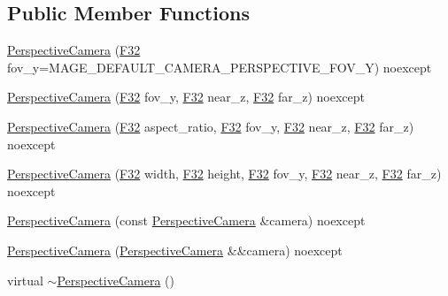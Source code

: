 \subsection*{Public Member Functions}
\begin{DoxyCompactItemize}
\item 
\hyperlink{classmage_1_1_perspective_camera_a64b7794febfaaf250117279095c709a2}{Perspective\+Camera} (\hyperlink{namespacemage_aa97e833b45f06d60a0a9c4fc22ae02c0}{F32} fov\+\_\+y=M\+A\+G\+E\+\_\+\+D\+E\+F\+A\+U\+L\+T\+\_\+\+C\+A\+M\+E\+R\+A\+\_\+\+P\+E\+R\+S\+P\+E\+C\+T\+I\+V\+E\+\_\+\+F\+O\+V\+\_\+Y) noexcept
\item 
\hyperlink{classmage_1_1_perspective_camera_a2be0521c2d0da56c10442928be5fc1c3}{Perspective\+Camera} (\hyperlink{namespacemage_aa97e833b45f06d60a0a9c4fc22ae02c0}{F32} fov\+\_\+y, \hyperlink{namespacemage_aa97e833b45f06d60a0a9c4fc22ae02c0}{F32} near\+\_\+z, \hyperlink{namespacemage_aa97e833b45f06d60a0a9c4fc22ae02c0}{F32} far\+\_\+z) noexcept
\item 
\hyperlink{classmage_1_1_perspective_camera_a9e59b05f13dba33c00b251ae952943d6}{Perspective\+Camera} (\hyperlink{namespacemage_aa97e833b45f06d60a0a9c4fc22ae02c0}{F32} aspect\+\_\+ratio, \hyperlink{namespacemage_aa97e833b45f06d60a0a9c4fc22ae02c0}{F32} fov\+\_\+y, \hyperlink{namespacemage_aa97e833b45f06d60a0a9c4fc22ae02c0}{F32} near\+\_\+z, \hyperlink{namespacemage_aa97e833b45f06d60a0a9c4fc22ae02c0}{F32} far\+\_\+z) noexcept
\item 
\hyperlink{classmage_1_1_perspective_camera_a3f6796f0482652bd9768af34853cae65}{Perspective\+Camera} (\hyperlink{namespacemage_aa97e833b45f06d60a0a9c4fc22ae02c0}{F32} width, \hyperlink{namespacemage_aa97e833b45f06d60a0a9c4fc22ae02c0}{F32} height, \hyperlink{namespacemage_aa97e833b45f06d60a0a9c4fc22ae02c0}{F32} fov\+\_\+y, \hyperlink{namespacemage_aa97e833b45f06d60a0a9c4fc22ae02c0}{F32} near\+\_\+z, \hyperlink{namespacemage_aa97e833b45f06d60a0a9c4fc22ae02c0}{F32} far\+\_\+z) noexcept
\item 
\hyperlink{classmage_1_1_perspective_camera_a2a3a1696451f48aa4170669091652860}{Perspective\+Camera} (const \hyperlink{classmage_1_1_perspective_camera}{Perspective\+Camera} \&camera) noexcept
\item 
\hyperlink{classmage_1_1_perspective_camera_a7ca5bbd2637f6d27a0be68635acd4788}{Perspective\+Camera} (\hyperlink{classmage_1_1_perspective_camera}{Perspective\+Camera} \&\&camera) noexcept
\item 
virtual \hyperlink{classmage_1_1_perspective_camera_a47ba88d7458528795dd832474cdb3eb9}{$\sim$\+Perspective\+Camera} ()

\end{DoxyCompactItemize}
